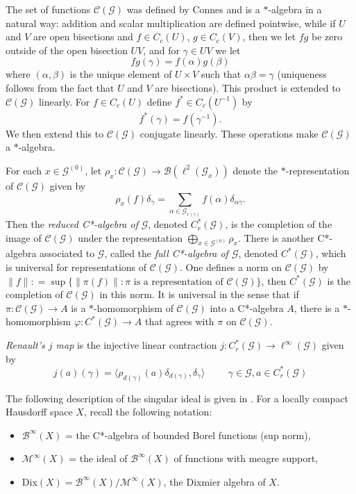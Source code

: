\documentclass[12pt]{amsart}
\theoremstyle{definition}
\theoremstyle{remark}
\numberwithin{equation}{section}
\newcommand{\mc}{\mathcal}
\renewcommand{\a}{\alpha}
\renewcommand{\b}{\beta}
\newcommand{\M}{\mathcal{M}}
\newcommand{\B}{\mathcal{B}}
\newcommand{\vp}{\varphi}
\newcommand{\go}{\g^{(0)}}
\newcommand{\g}{\mathcal{G}}
\newcommand{\C}{\mathcal{C}}
\newcommand{\ga}{\gamma}
\begin{document}
	The set of functions $\C(\g)$ was defined by Connes \cite{Co82} \cite{CoNCG} and is a $*$-algebra in a natural way: addition and scalar multiplication are defined pointwise, while if $U$ and $V$ are open bisections and $f\in C_c(U)$, $g\in C_c(V)$, then we let $fg$ be zero outside of the open bisection $UV$, and for $\ga\in UV$ we let
	\[
	fg(\ga) = f(\a)g(\b)
	\]
	where $(\a,\b)$ is the unique element of $U\times V$ such that $\a\b = \ga$ (uniqueness follows from the fact that $U$ and $V$ are bisections). This product is extended to $\C(\g)$ linearly. For $f\in C_c(U)$ define $f^*\in  C_c(U^{-1})$ by
	\[
	f^*(\ga) = \overline{f(\ga^{-1})}.
	\]
	We then extend this to $\C(\g)$ conjugate linearly. These operations make $\C(\g)$ a $*$-algebra. 
	
	For each $x\in \go$, let $\rho_x: \C(\g)\to \mc{B}(\ell^2(\g_x))$ denote the $*$-representation of $\C(\g)$ given by
	\[
	\rho_x(f)\delta_\ga = \sum_{\a\in \g_{r(\ga)}}f(\a)\delta_{\a\ga}.
	\]
	Then the {\em reduced C*-algebra of} $\g$, denoted $C_r^*(\g)$, is the completion of the image of $\C(\g)$ under the representation $\bigoplus_{x\in \go}\rho_x$. There is another C*-algebra associated to $\g$, called the {\em full C*-algebra of $\g$}, denoted $C^*(\g)$, which is universal for representations of $\C(\g)$. One defines a norm on $\C(\g)$ by $\|f\|: = \sup\{\|\pi(f)\|:\pi\text{ is a representation of }\C(\g)\}$, then $C^*(\g)$ is the completion of $\C(\g)$ in this norm. It is universal in the sense that if $\pi:\C(\g)\to A$ is a $*$-homomorphism of $\C(\g)$ into a C*-algebra $A$, there is a $*$-homomorphism $\vp:C^*(\g)\to A$ that agrees with $\pi$ on $\C(\g)$. 
	 
	 {\em Renault's $j$ map} is the injective linear contraction $j: C^*_r(\g)\to \ell^\infty(\g)$ given by
	 \[
	 j(a)(\ga) = \langle \rho_{d(\ga)}(a)\delta_{d(\ga)}, \delta_{\ga} \rangle \hspace{1cm}\ga\in \g, a\in C^*_r(\g)
	 \]
	 
	 The following description of the singular ideal is given in \cite{KKLRU21}. For a locally compact Hausdorff space $X$, recall the following notation:
	 \begin{itemize}
	 	\item $\B^\infty(X)$ = the C*-algebra of bounded Borel functions (sup norm),
	 	\item $\M^\infty(X)$ = the ideal of $\B^\infty(X)$ of functions with meagre support,
	 	\item Dix$(X) = \B^\infty(X)/\M^\infty(X)$, the Dixmier algebra of $X$.
	 \end{itemize}
	
\end{document}
